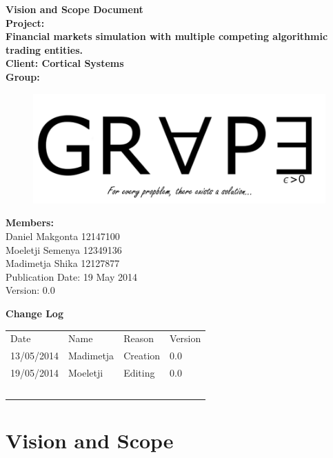 \documentclass[12pt]{article}
\newcommand{\Title}{Vision and Scope Document} %
\begin{document}
	\begin{center}%
		\LARGE \bf \Title \\[2em]
		\Large {Project:}\\
		Financial markets simulation with multiple competing algorithmic trading entities.\\[0.7em]
		\Large {Client:}
		Cortical Systems\\[2em]
		\LARGE {\bf Group:}\\
			\begin{figure}[ht!]
				\centering
				\includegraphics[scale=0.4]{Logo8.png}
			\end{figure}
			
		\Large {\bf Members:}\\[0.3em]
		\large
		Daniel Makgonta 12147100\\
		Moeletji Semenya 12349136\\
		Madimetja Shika 12127877\\[3em]
	
	\small Publication Date: 19 May 2014\\[0.5em]
	\small Version: 0.0 		    
	\end{center}%
	
	\newpage		
	\LARGE 
 	{\bf Change Log}\\[1em]
	\begin{tabular}{llll}
		Date & Name & Reason & Version \\
		13/05/2014 & Madimetja & Creation & 0.0 \\
		19/05/2014 & Moeletji & Editing & 0.0 \\
		~ & ~ & ~ & ~ \\
	\end{tabular}
	

	
	\newpage
	\tableofcontents
				  
	\newpage
	\section{Vision and Scope}
\end{document}
